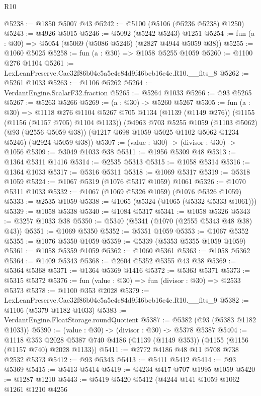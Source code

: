 \begin{lexlean}{R10}
\begin{coremodule}
@5238 := @1850 @5007 @43
@5242 := @5100 (@5106 (@5236 @5238) @1250)
@5243 := @4926 @5015
@5246 := @5092 (@5242 @5243) @1251
@5254 := fun (a : @30) => @5054 (@5069 (@5086 @5246) (@2827 @4944 @5059 @38))
@5255 := @1060 @5025
@5258 := fun (a : @30) => @1058 @5255 @1059
@5260 := @1100 @276 @1104
@5261 := LexLeanPreserve.Cac32f86b04c5a5e4c84d9f46beb16e4c.R10.__fits_8
@5262 := @5261 @1033
@5263 := @1106 @5262
@5264 := VerdantEngine.ScalarF32.fraction
@5265 := @5264 @1033
@5266 := @93 @5265
@5267 := @5263 @5266
@5269 := (a : @30) -> @5260 @5267
@5305 := fun (a : @30) =>
  @1118
    @276
    @1104
    @5267
    @705
    @1134
    (@1139 (@1149 @276))
    (@1155 (@1156 (@1157 @705) @1104 @1133))
    (@4963
      @703
      @5255
      @1059
      (@1103 @5062)
      (@93 (@2556 @5059 @38))
      (@1217 @698 @1059 @5025 @1102 @5062 @1234 @5246)
      (@2924 @5059 @38))
@5307 := (value : @30) -> (divisor : @30) -> @1056
@5309 := @3049 @1033 @38
@5311 := @1956 @5309 @48
@5313 := @1364 @5311 @1416
@5314 := @2535 @5313
@5315 := @1058 @5314
@5316 := @1364 @1033
@5317 := @5316 @5311
@5318 := @1069 @5317
@5319 := @5318 @1059
@5324 := @1067 @5319 (@1076 @5317 @1059) @1061
@5326 := @1070 @5311 @1033
@5332 := @1067 (@1069 @5326 @1059) (@1076 @5326 @1059)
@5333 := @2535 @1059
@5338 := @1065 (@5324 (@1065 (@5332 @5333 @1061)))
@5339 := @1058 @5338
@5340 := @1084 @5317
@5341 := @1058 @5326
@5343 := @3257 @1033 @38
@5350 := @5340 (@5341 (@1070 (@2555 @5343 @48 @38) @43))
@5351 := @1069 @5350
@5352 := @5351 @1059
@5353 := @1067 @5352
@5355 := @1076 @5350 @1059
@5359 := @5339 (@5353 @5355 @1059 @1059)
@5361 := @1058 @5359 @1059
@5362 := @1060 @5361
@5363 := @1058 @5362
@5364 := @1409 @5343
@5368 := @2604 @5352 @5355 @43 @38
@5369 := @5364 @5368
@5371 := @1364 @5369 @1416
@5372 := @5363 @5371
@5373 := @5315 @5372
@5376 := fun (value : @30) => fun (divisor : @30) => @2533 @5373
@5378 := @1100 @353 @2028
@5379 := LexLeanPreserve.Cac32f86b04c5a5e4c84d9f46beb16e4c.R10.__fits_9
@5382 := @1106 (@5379 @1182 @1033)
@5383 := VerdantEngine.FloatStorage.roundQuotient
@5387 := @5382 (@93 (@5383 @1182 @1033))
@5390 := (value : @30) -> (divisor : @30) -> @5378 @5387
@5404 := @1118
    @353
    @2028
    @5387
    @740
    @4186
    (@1139 (@1149 @353))
    (@1155 (@1156 (@1157 @740) @2028 @1133))
@5411 := @2772 @4186 @48 @11 @708 @738 @2532 @5373
@5412 := @93 @5343
@5413 := @5411 @5412
@5414 := @93 @5369
@5415 := @5413 @5414
@5419 := @4234 @417 @707 @1995 @1059
@5420 := @1287 @1210
@5443 := @5419
    @5420
    @5412
    (@4244
      @141
      @1059
      @1062
      @1261
      @1210
      @4256

\end{coremodule}
\end{lexlean}
